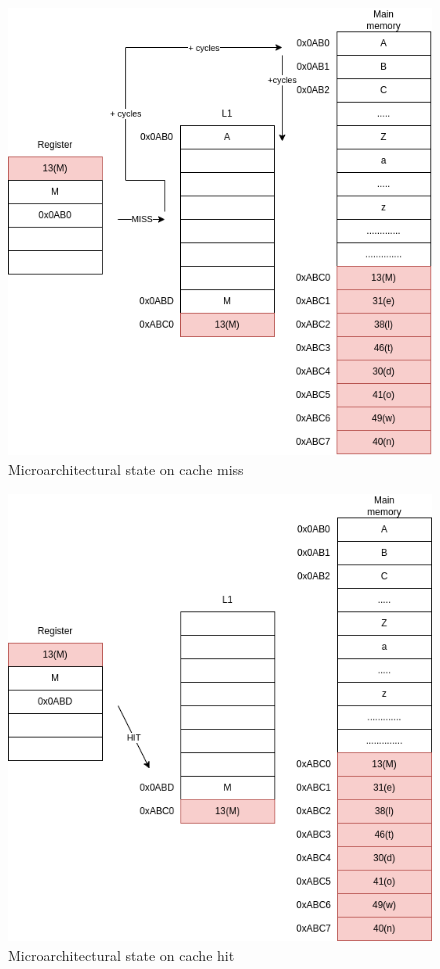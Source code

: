 \begin{figure}[!h]
    \includegraphics[scale=0.25]{img/meltdown-step-two.png}
    \caption{Microarchitectural state on cache miss}
\end{figure}
\begin{figure}[!h]
    \includegraphics[scale=0.25]{img/meltdown-step-four.png}
    \caption{Microarchitectural state on cache hit}
\end{figure}

